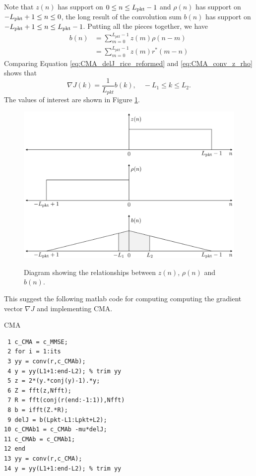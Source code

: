 Note that $z(n)$ has support on $0 \leq n \leq L_\text{pkt}-1$ and 
$\rho(n)$ has support on $-L_\text{pkt}+1 \leq n \leq 0$, 
the long result of the convolution sum $b(n)$ has support on $-L_\text{pkt}+1 \leq n \leq L_\text{pkt}-1$.
Putting all the pieces together, we have
\begin{align}
b(n) &= \sum^{L_{pkt}-1}_{m=0} z(m) \rho(n-m) \nonumber \\
	 &= \sum^{L_{pkt}-1}_{m=0} z(m) r^\ast(m-n)
	 \label{eq:CMA_conv_z_rho}
\end{align}
Comparing Equation \eqref{eq:CMA_delJ_rice_reformed} and \eqref{eq:CMA_conv_z_rho} shows that 
\begin{equation}
\nabla J(k) = \frac{1}{L_{pkt}} b(k), \quad -L_1 \leq k \leq L_2.
\label{eq:CMA_delJ_donzo}
\end{equation}
The values of interest are shown in Figure \ref{fig:convolutionFigureRice}.
\begin{figure}
	\centering\includegraphics[width=10in/100*55]{figures/eq_equations/convolutionFigureRice.pdf}
	\label{fig:convolutionFigureRice}
	\caption{Diagram showing the relationships between $z(n)$, $\rho(n)$ and $b(n)$.}
\end{figure}

This suggest the following matlab code for computing computing the gradient vector $\nabla J$ and implementing CMA.
\begin{table}[h]
\caption{CMA}
\label{code:CMA}
\singlespacing
{\footnotesize
\begin{verbatim}
 1 c_CMA = c_MMSE;
 2 for i = 1:its
 3 yy = conv(r,c_CMAb);
 4 y = yy(L1+1:end-L2); % trim yy
 5 z = 2*(y.*conj(y)-1).*y;
 6 Z = fft(z,Nfft);
 7 R = fft(conj(r(end:-1:1)),Nfft)
 8 b = ifft(Z.*R);
 9 delJ = b(Lpkt-L1:Lpkt+L2);
10 c_CMAb1 = c_CMAb -mu*delJ;
11 c_CMAb = c_CMAb1;
12 end
13 yy = conv(r,c_CMA);
14 y = yy(L1+1:end-L2); % trim yy
\end{verbatim}
}
\end{table}
\doublespacing

